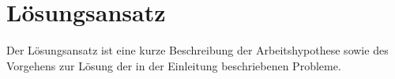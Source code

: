 \chapter{Lösungsansatz}\label{ch:approach}
Der Lösungsansatz ist eine kurze Beschreibung der Arbeitshypothese sowie des Vorgehens zur Lösung der in der Einleitung beschriebenen Probleme.

